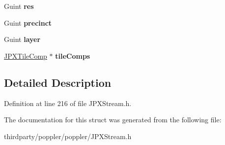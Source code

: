 \begin{DoxyCompactItemize}
\item 
\mbox{\label{struct_j_p_x_tile_a57828bce8c8acac1b2cb9b362c6c5e5a}} 
Guint {\bfseries res}
\item 
\mbox{\label{struct_j_p_x_tile_acd481aa5f71ad847ff815a332ef96e7a}} 
Guint {\bfseries precinct}
\item 
\mbox{\label{struct_j_p_x_tile_a3291d8f9d015ab82e89b2eecc86e3b21}} 
Guint {\bfseries layer}
\item 
\mbox{\label{struct_j_p_x_tile_afd670261cf7565b3d3c52a40e61e7f18}} 
\hyperlink{struct_j_p_x_tile_comp}{J\+P\+X\+Tile\+Comp} $\ast$ {\bfseries tile\+Comps}
\end{DoxyCompactItemize}


\subsection{Detailed Description}


Definition at line 216 of file J\+P\+X\+Stream.\+h.



The documentation for this struct was generated from the following file\+:\begin{DoxyCompactItemize}
\item 
thirdparty/poppler/poppler/J\+P\+X\+Stream.\+h\end{DoxyCompactItemize}
